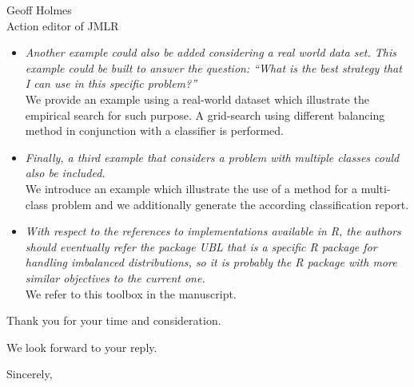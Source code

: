 \documentclass{letter}
\begin{document}
\begin{letter}{Geoff Holmes \\ Action editor of JMLR}
\begin{itemize}
    and index of balanced accuracy have been added. Additionally, we
    proposed a method to generate a classification report reporting
    the different metrics. Furthermore, examples presenting the
    metrics have been added to the documentation.
  \item \textit{Another example could also be added considering a
      real world data set. This example could be built to answer the
      question:
      ``What is the best strategy that I can use in this specific
      problem?''} \\
    We provide an example using a real-world dataset which
    illustrate the empirical search for such purpose. A grid-search
    using different balancing method in conjunction with a
    classifier is performed.
  \item \textit{Finally, a third example that considers a problem
      with multiple classes could also be included.} \\
    We introduce an example which illustrate the use of a method for
    a multi-class problem and we additionally generate the according
    classification report.
  \item \textit{With respect to the references to implementations
      available in R, the authors should eventually refer the
      package UBL that is a specific R package for handling
      imbalanced distributions, so it is probably the R package with
      more similar objectives to the current one.} \\
    We refer to this toolbox in the manuscript.
  \end{itemize}


  Thank you for your time and consideration.

  We look forward to your reply.

  \vspace{2\parskip} %
  \closing{Sincerely,}
  \vspace{2\parskip} %


\end{letter}
\end{document}
